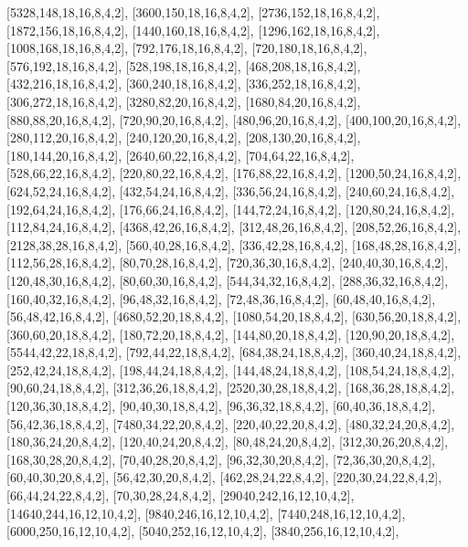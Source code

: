 \documentclass[12pt]{amsart}
\begin{document}
[5328,148,18,16,8,4,2],   [3600,150,18,16,8,4,2],   [2736,152,18,16,8,4,2],   [1872,156,18,16,8,4,2],   [1440,160,18,16,8,4,2],   [1296,162,18,16,8,4,2],
[1008,168,18,16,8,4,2],   [792,176,18,16,8,4,2],   [720,180,18,16,8,4,2],   [576,192,18,16,8,4,2],   [528,198,18,16,8,4,2],   [468,208,18,16,8,4,2],
[432,216,18,16,8,4,2],   [360,240,18,16,8,4,2],   [336,252,18,16,8,4,2],   [306,272,18,16,8,4,2],   [3280,82,20,16,8,4,2],   [1680,84,20,16,8,4,2],   [880,88,20,16,8,4,2],
[720,90,20,16,8,4,2],   [480,96,20,16,8,4,2],   [400,100,20,16,8,4,2],   [280,112,20,16,8,4,2],   [240,120,20,16,8,4,2],   [208,130,20,16,8,4,2],   [180,144,20,16,8,4,2],
[2640,60,22,16,8,4,2],   [704,64,22,16,8,4,2],   [528,66,22,16,8,4,2],   [220,80,22,16,8,4,2],   [176,88,22,16,8,4,2],   [1200,50,24,16,8,4,2],   [624,52,24,16,8,4,2],
[432,54,24,16,8,4,2],   [336,56,24,16,8,4,2],   [240,60,24,16,8,4,2],   [192,64,24,16,8,4,2],   [176,66,24,16,8,4,2],   [144,72,24,16,8,4,2],   [120,80,24,16,8,4,2],
[112,84,24,16,8,4,2],   [4368,42,26,16,8,4,2],   [312,48,26,16,8,4,2],   [208,52,26,16,8,4,2],   [2128,38,28,16,8,4,2],   [560,40,28,16,8,4,2],   [336,42,28,16,8,4,2],
[168,48,28,16,8,4,2],   [112,56,28,16,8,4,2],   [80,70,28,16,8,4,2],   [720,36,30,16,8,4,2],   [240,40,30,16,8,4,2],   [120,48,30,16,8,4,2],   [80,60,30,16,8,4,2],
[544,34,32,16,8,4,2],   [288,36,32,16,8,4,2],   [160,40,32,16,8,4,2],   [96,48,32,16,8,4,2],   [72,48,36,16,8,4,2],   [60,48,40,16,8,4,2],   [56,48,42,16,8,4,2],
[4680,52,20,18,8,4,2],   [1080,54,20,18,8,4,2],   [630,56,20,18,8,4,2],   [360,60,20,18,8,4,2],   [180,72,20,18,8,4,2],   [144,80,20,18,8,4,2],   [120,90,20,18,8,4,2],
[5544,42,22,18,8,4,2],   [792,44,22,18,8,4,2],   [684,38,24,18,8,4,2],   [360,40,24,18,8,4,2],   [252,42,24,18,8,4,2],   [198,44,24,18,8,4,2],   [144,48,24,18,8,4,2],
[108,54,24,18,8,4,2],   [90,60,24,18,8,4,2],   [312,36,26,18,8,4,2],   [2520,30,28,18,8,4,2],   [168,36,28,18,8,4,2],   [120,36,30,18,8,4,2],   [90,40,30,18,8,4,2],
[96,36,32,18,8,4,2],   [60,40,36,18,8,4,2],   [56,42,36,18,8,4,2],   [7480,34,22,20,8,4,2],   [220,40,22,20,8,4,2],   [480,32,24,20,8,4,2],   [180,36,24,20,8,4,2],
[120,40,24,20,8,4,2],   [80,48,24,20,8,4,2],   [312,30,26,20,8,4,2],   [168,30,28,20,8,4,2],   [70,40,28,20,8,4,2],   [96,32,30,20,8,4,2],   [72,36,30,20,8,4,2],
[60,40,30,20,8,4,2],   [56,42,30,20,8,4,2],   [462,28,24,22,8,4,2],   [220,30,24,22,8,4,2],   [66,44,24,22,8,4,2],   [70,30,28,24,8,4,2],   [29040,242,16,12,10,4,2],
[14640,244,16,12,10,4,2],   [9840,246,16,12,10,4,2],   [7440,248,16,12,10,4,2],   [6000,250,16,12,10,4,2],   [5040,252,16,12,10,4,2],   [3840,256,16,12,10,4,2],
\end{document}
